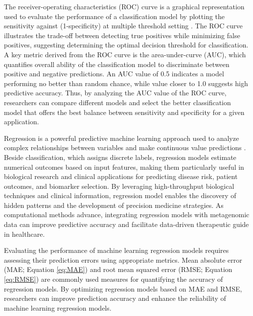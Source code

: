 \documentclass[11pt, a4paper, onecolumn, oneside]{report}
\begin{document}
        The receiver-operating characteristics (ROC) curve is a graphical representation used to evaluate the performance of a classification model by plotting the sensitivity against (1-specificity) at multiple threshold setting \cite{classification-evaluation-2, classification-evaluation-3, classification-evaluation-4}. The ROC curve illustrates the trade-off between detecting true positives while minimizing false positives, suggesting determining the optimal decision threshold for classification. A key metric derived from the ROC curve is the area-under-curve (AUC), which quantifies overall ability of the classification model to discriminate between positive and negative predictions. An AUC value of 0.5 indicates a model performing no better than random chance, while value closer to 1.0 suggests high predictive accuracy. Thus, by analyzing the AUC value of the ROC curve, researchers can compare different models and select the better classification model that offers the best balance between sensitivity and specificity for a given application.

        Regression is a powerful predictive machine learning approach used to analyze complex relationships between variables and make continuous value predictions \cite{regression-1, regression-2}. Beside classification, which assigns discrete labels, regression models estimate numerical outcomes based on input features, making them particularly useful in biological research and clinical applications for predicting disease risk, patient outcomes, and biomarker selection. By leveraging high-throughput biological techniques and clinical information, regression model enables the discovery of hidden patterns and the development of precision medicine strategies. As computational methods advance, integrating regression models with metagenomic data can improve predictive accuracy and facilitate data-driven therapeutic guide in healthcare.

        Evaluating the performance of machine learning regression models requires assessing their prediction errors using appropriate metrics. Mean absolute error (MAE; Equation \ref{eq:MAE}) and root mean squared error (RMSE; Equation \ref{eq:RMSE}) are commonly used measures for quantifying the accuracy of regression models. By optimizing regression models based on MAE and RMSE, researchers can improve prediction accuracy and enhance the reliability of machine learning regression models.
\end{document}
